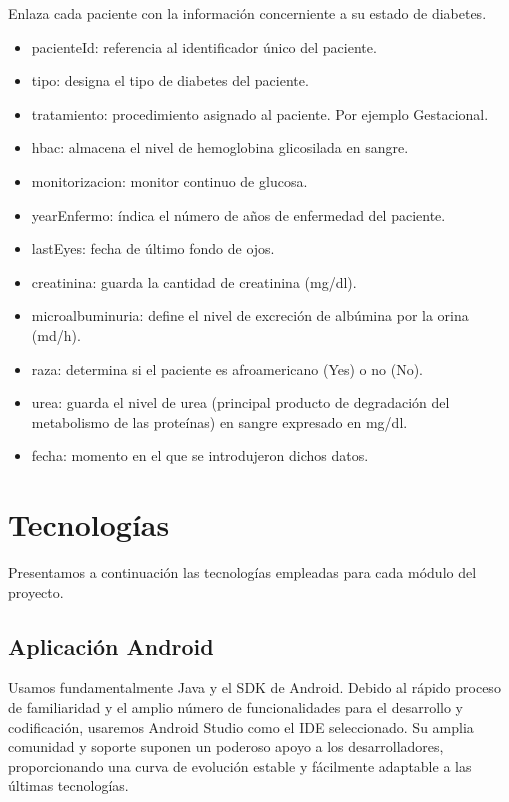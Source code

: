\documentclass[11pt,spanish,
		listoftables,listoffigures]
		{tfgplantilla}
\begin{document}
Enlaza cada paciente con la información concerniente a su estado de diabetes.
\begin{itemize}
	\item pacienteId: referencia al identificador único del paciente. 
	\item tipo: designa el tipo de diabetes del paciente.
	\item tratamiento: procedimiento asignado al paciente. Por ejemplo Gestacional.
	\item hbac: almacena el nivel de hemoglobina glicosilada en sangre.
	\item monitorizacion: monitor continuo de glucosa.
	\item yearEnfermo: índica el número de años de enfermedad del paciente.
	\item lastEyes: fecha de último fondo de ojos.
	\item creatinina: guarda la cantidad de creatinina (mg/dl).
	\item microalbuminuria: define el nivel de excreción de albúmina por la orina (md/h).
	\item raza: determina si el paciente es afroamericano (Yes) o no (No).
	\item urea: guarda el nivel de urea (principal producto de degradación del metabolismo de las proteínas) en sangre expresado en mg/dl.
	\item fecha: momento en el que se introdujeron dichos datos.	
\end{itemize}


\chapter{Tecnolog\'ias}

Presentamos a continuación las tecnologías empleadas para cada módulo del proyecto. 

\section {Aplicación Android}

Usamos fundamentalmente Java y el SDK de Android. Debido al rápido proceso de familiaridad y el amplio número de funcionalidades para el desarrollo y codificación, usaremos Android Studio como el IDE seleccionado. Su amplia comunidad y soporte suponen un poderoso apoyo a los desarrolladores, proporcionando una curva de evolución estable y fácilmente adaptable a las últimas tecnologías.
\end{document}
